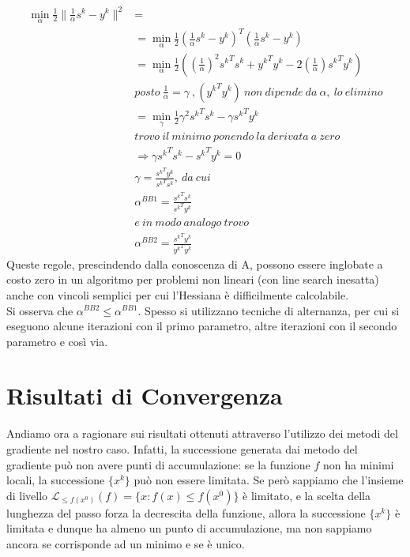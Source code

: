 \documentclass{report}
\begin{document}
\begin{equation} 
\label{BB6}
	\begin{split}
	\min_{\alpha} \frac{1}{2} \|\frac{1}{\alpha} s^k - y^k\|^2& =\\
	 &= \min_{\alpha} \frac{1}{2}\left (\frac{1}{\alpha} s^k - y^k\right)^T\left(\frac{1}{\alpha} s^k - y^k\right)\\
	 &= \min_{\alpha} \frac{1}{2} \left(\left(\frac{1}{\alpha}\right)^2 {s^k}^T s^k + {y^k}^T y^k-2\left(\frac{1}{\alpha}\right){s^k}^T y^k\right)\\
	 & posto\  \frac{1}{\alpha} = \gamma \ ,({y^k}^T y^k)\ non\ dipende\ da\ \alpha,\ lo\ elimino\\
	 &=  \min_{\gamma} \frac{1}{2} \gamma^2 {s^k}^T s^k -\gamma{s^k}^T y^k\\
	 &trovo\ il\ minimo\ ponendo\ la\ derivata\ a\ zero\\
	 &\Rightarrow \gamma {s^k}^T s^k -{s^k}^T y^k = 0\\
	 & \gamma = \frac{{s^k}^T y^k}{{s^k}^T s^k}, \ da\ cui\\
	 & \alpha^{BB1} = \frac{{s^k}^T s^k}{{s^k}^T y^k}\\
	 & e\ in\ modo\ analogo\ trovo \\
	 & \alpha^{BB2} = \frac{{s^k}^T y^k}{{y^k}^T y^k}
	\end{split}
\end{equation}
Queste regole, prescindendo dalla conoscenza di A, possono essere inglobate a costo zero in un algoritmo per problemi non lineari (con line search inesatta) anche con vincoli semplici per cui l'Hessiana è difficilmente calcolabile.\\
Si osserva che $\alpha^{BB2} \leqslant \alpha^{BB1}$. Spesso si utilizzano tecniche di alternanza, per cui si eseguono alcune iterazioni con il primo parametro, altre iterazioni con il secondo parametro e così via.

\section{Risultati di Convergenza}
Andiamo ora a ragionare sui risultati ottenuti attraverso l'utilizzo dei metodi del gradiente nel nostro caso. Infatti, la successione generata dai metodo del gradiente può non avere punti di accumulazione: se la funzione $f$ non ha minimi locali, la successione $\{x^k\}$ può non essere limitata. Se però sappiamo che l'insieme di livello $\mathcal{L}_{\leqslant f(x^0)}(f) = \{x: f(x) \leqslant f(x^0)\}$ è limitato, e la scelta della lunghezza del passo forza la decrescita della funzione, allora la successione $\{x^k\}$ è limitata e dunque ha almeno un punto di accumulazione, ma non sappiamo ancora se corrisponde ad un minimo e se è unico.\\
\end{document}
